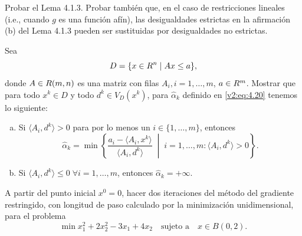 \begin{exercise}\label{v2:ejer:4.1.7}
    Probar el Lema 4.1.3. Probar también que, en el caso de restricciones lineales (i.e., cuando $g$ es una función afín), las desigualdades estrictas en la afirmación (b) del Lema 4.1.3 pueden ser sustituidas por desigualdades no estrictas.
\end{exercise}

\begin{exercise}\label{v2:ejer:4.1.8}
    Sea
    \[
        D = \{x \in R^n \mid Ax \le a\},
    \]
    donde $A \in R(m, n)$ es una matriz con filas $A_i, i = 1, \dots, m$, $a \in R^m$. Mostrar que para todo $x^k \in D$ y todo $d^k \in V_D(x^k)$, para $\hat{\alpha}_k$ definido en \eqref{v2:eq:4.20} tenemos lo siguiente:
    \begin{enumerate}[(a)]
        \item Si $\langle A_i, d^k \rangle > 0$ para por lo menos un $i \in \{1, \dots, m\}$, entonces
        \[
            \hat{\alpha}_k = \min \left\{ \frac{a_i - \langle A_i, x^k \rangle}{\langle A_i, d^k \rangle} \;\middle|\; i = 1, \dots, m \colon \langle A_i, d^k \rangle > 0 \right\}.
        \]
        \item Si $\langle A_i, d^k \rangle \le 0 \; \forall i = 1, \dots, m$, entonces $\hat{\alpha}_k = +\infty$.
    \end{enumerate}
\end{exercise}

\begin{exercise}\label{v2:ejer:4.1.9}
    A partir del punto inicial $x^0 = 0$, hacer dos iteraciones del método del gradiente restringido, con longitud de paso calculado por la minimización unidimensional, para el problema
    \[
        \min x_1^2 + 2x_2^2 - 3x_1 + 4x_2 \quad \text{sujeto a} \quad x \in B(0, 2).
    \]
\end{exercise}

